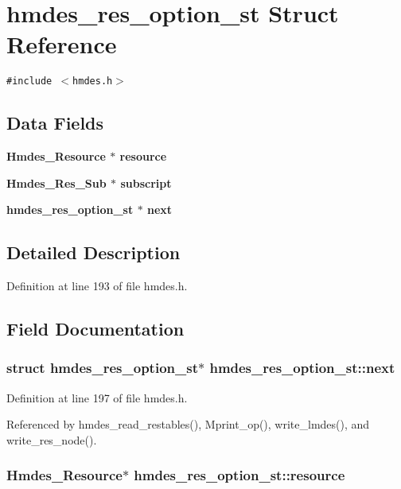 \section{hmdes\_\-res\_\-option\_\-st Struct Reference}
\label{structhmdes__res__option__st}
{\tt \#include $<$hmdes.h$>$}

\subsection*{Data Fields}
\begin{CompactItemize}
\item 
\bf{Hmdes\_\-Resource} $\ast$ \bf{resource}
\item 
\bf{Hmdes\_\-Res\_\-Sub} $\ast$ \bf{subscript}
\item 
\bf{hmdes\_\-res\_\-option\_\-st} $\ast$ \bf{next}
\end{CompactItemize}


\subsection{Detailed Description}




Definition at line 193 of file hmdes.h.

\subsection{Field Documentation}
\subsubsection{\setlength{\rightskip}{0pt plus 5cm}struct \bf{hmdes\_\-res\_\-option\_\-st}$\ast$ \bf{hmdes\_\-res\_\-option\_\-st::next}}\label{structhmdes__res__option__st_3d45d17fa906af82ae8f4f68f3de25b1}




Definition at line 197 of file hmdes.h.

Referenced by hmdes\_\-read\_\-restables(), Mprint\_\-op(), write\_\-lmdes(), and write\_\-res\_\-node().
\subsubsection{\setlength{\rightskip}{0pt plus 5cm}\bf{Hmdes\_\-Resource}$\ast$ \bf{hmdes\_\-res\_\-option\_\-st::resource}}\label{structhmdes__res__option__st_07c78c96bd3b51bbfa561fe6e21c0fe0}




